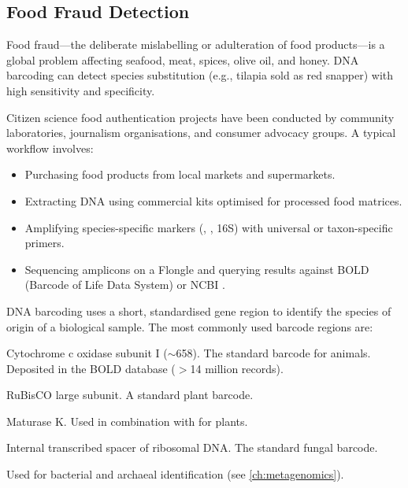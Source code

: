 \subsection{Food Fraud Detection}
\label{subsec:accessible:foodfraud}

Food fraud---the deliberate mislabelling or adulteration of food products---is a global problem affecting seafood, meat, spices, olive oil, and honey. DNA barcoding can detect species substitution (e.g., tilapia sold as red snapper) with high sensitivity and specificity.

Citizen science food authentication projects have been conducted by community laboratories, journalism organisations, and consumer advocacy groups. A typical workflow involves:

\begin{itemize}[itemsep=2pt]
  \item Purchasing food products from local markets and supermarkets.
  \item Extracting DNA using commercial kits optimised for processed food matrices.
  \item Amplifying species-specific markers (, , 16S) with universal or taxon-specific primers.
  \item Sequencing amplicons on a Flongle and querying results against BOLD (Barcode of Life Data System) or NCBI .
\end{itemize}

\begin{keyconcept}[title={DNA Barcoding for Species Identification}]
DNA barcoding uses a short, standardised gene region to identify the species of origin of a biological sample. The most commonly used barcode regions are:
\begin{description}[nosep]
  \item[\gene{COI}] Cytochrome c oxidase subunit I (${\sim}$658\basepair). The standard barcode for animals. Deposited in the BOLD database ($>$14 million records).
  \item[\gene{rbcL}] RuBisCO large subunit. A standard plant barcode.
  \item[\gene{matK}] Maturase K. Used in combination with  for plants.
  \item[ITS] Internal transcribed spacer of ribosomal DNA. The standard fungal barcode.
  \item[16S rRNA] Used for bacterial and archaeal identification (see \cref{ch:metagenomics}).
\end{description}
\end{keyconcept}

